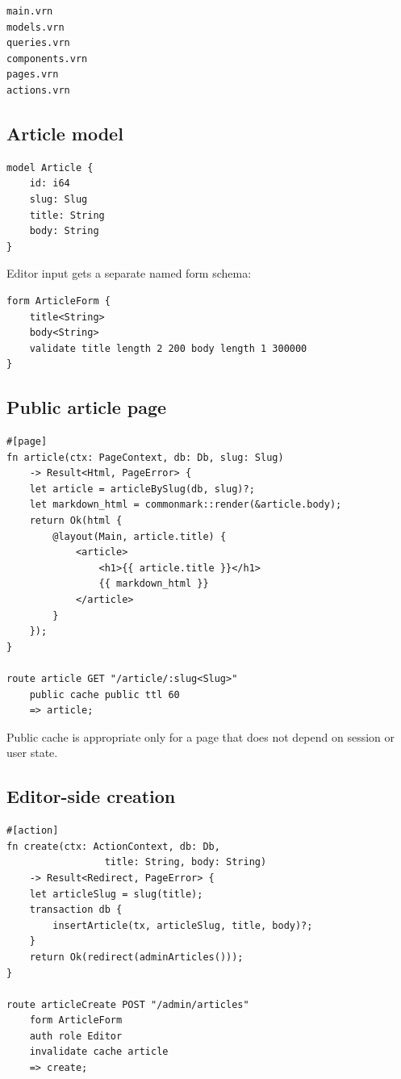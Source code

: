 \begin{lstlisting}
main.vrn
models.vrn
queries.vrn
components.vrn
pages.vrn
actions.vrn
\end{lstlisting}

\subsection*{Article model}

\begin{lstlisting}[language=Velran]
model Article {
    id: i64
    slug: Slug
    title: String
    body: String
}
\end{lstlisting}

Editor input gets a separate named form schema:

\begin{lstlisting}[language=Velran]
form ArticleForm {
    title<String>
    body<String>
    validate title length 2 200 body length 1 300000
}
\end{lstlisting}

\subsection*{Public article page}

\begin{lstlisting}[language=Velran]
#[page]
fn article(ctx: PageContext, db: Db, slug: Slug)
    -> Result<Html, PageError> {
    let article = articleBySlug(db, slug)?;
    let markdown_html = commonmark::render(&article.body);
    return Ok(html {
        @layout(Main, article.title) {
            <article>
                <h1>{{ article.title }}</h1>
                {{ markdown_html }}
            </article>
        }
    });
}

route article GET "/article/:slug<Slug>"
    public cache public ttl 60
    => article;
\end{lstlisting}

Public cache is appropriate only for a page that does not depend on session or user state.

\subsection*{Editor-side creation}

\begin{lstlisting}[language=Velran]
#[action]
fn create(ctx: ActionContext, db: Db,
                 title: String, body: String)
    -> Result<Redirect, PageError> {
    let articleSlug = slug(title);
    transaction db {
        insertArticle(tx, articleSlug, title, body)?;
    }
    return Ok(redirect(adminArticles()));
}

route articleCreate POST "/admin/articles"
    form ArticleForm
    auth role Editor
    invalidate cache article
    => create;
\end{lstlisting}

